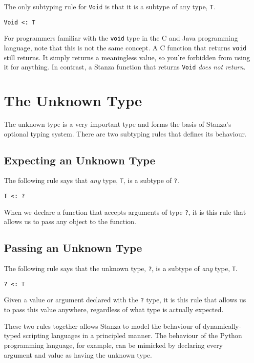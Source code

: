 \documentclass[10pt,oneside]{book}
\begin{document}
The only subtyping rule for \texttt{\frenchspacing Void} is that it is a subtype of any type, \texttt{\frenchspacing T}.
\begin{lstlisting}
Void <: T
\end{lstlisting}

For programmers familiar with the \texttt{\frenchspacing void} type in the C and Java programming language, note that this is not the same concept. A C function that returns \texttt{\frenchspacing void} still returns. It simply returns a meaningless value, so you're forbidden from using it for anything. In contrast, a Stanza function that returns \texttt{\frenchspacing Void} {\em does not return}.

\section{The Unknown Type}
The unknown type is a very important type and forms the basis of Stanza's optional typing system. There are two subtyping rules that defines its behaviour.

 \subsection*{Expecting an Unknown Type}
 The following rule says that {\em any} type, \texttt{\frenchspacing T}, is a subtype of \texttt{\frenchspacing ?}.
\begin{lstlisting}
T <: ?
\end{lstlisting}

When we declare a function that accepts arguments of type \texttt{\frenchspacing ?}, it is this rule that allows us to pass any object to the function.

\subsection*{Passing an Unknown Type}
The following rule says that the unknown type, \texttt{\frenchspacing ?}, is a subtype of {\em any} type, \texttt{\frenchspacing T}.
\begin{lstlisting}
? <: T
\end{lstlisting}

Given a value or argument declared with the \texttt{\frenchspacing ?} type, it is this rule that allows us to pass this value anywhere, regardless of what type is actually expected.

These two rules together allows Stanza to model the behaviour of dynamically-typed scripting languages in a principled manner. The behaviour of the Python programming language, for example, can be mimicked by declaring every argument and value as having the unknown type.
\end{document}
